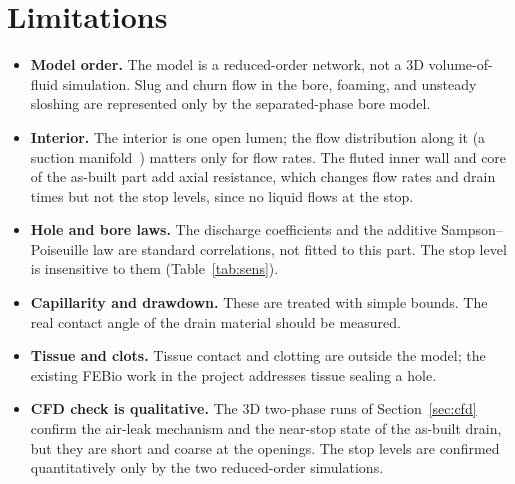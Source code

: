 \documentclass[10pt,a4paper]{article}
\begin{document}
\section{Limitations}\label{sec:limits}
\begin{itemize}
\item \textbf{Model order.} The model is a reduced-order network, not a 3D volume-of-fluid simulation. Slug and churn flow in the bore, foaming, and unsteady sloshing are represented only by the separated-phase bore model.
\item \textbf{Interior.} The interior is one open lumen; the flow distribution along it (a suction manifold~\cite{bajura1976}) matters only for flow rates. The fluted inner wall and core of the as-built part add axial resistance, which changes flow rates and drain times but not the stop levels, since no liquid flows at the stop.
\item \textbf{Hole and bore laws.} The discharge coefficients and the additive Sampson--Poiseuille law are standard correlations, not fitted to this part. The stop level is insensitive to them (Table~\ref{tab:sens}).
\item \textbf{Capillarity and drawdown.} These are treated with simple bounds. The real contact angle of the drain material should be measured.
\item \textbf{Tissue and clots.} Tissue contact and clotting are outside the model; the existing FEBio work in the project addresses tissue sealing a hole.
\item \textbf{CFD check is qualitative.} The 3D two-phase runs of Section~\ref{sec:cfd} confirm the air-leak mechanism and the near-stop state of the as-built drain, but they are short and coarse at the openings. The stop levels are confirmed quantitatively only by the two reduced-order simulations.
\end{itemize}

\end{document}

